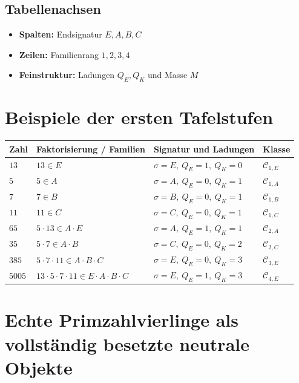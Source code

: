 \documentclass[12pt,a4paper]{article}
\newcommand{\sign}{\sigma}
\newcommand{\QE}{Q_E}
\newcommand{\QK}{Q_K}
\begin{document}
	\subsection*{Tabellenachsen}
	\begin{itemize}
		\item \textbf{Spalten:} Endsignatur $E,A,B,C$
		\item \textbf{Zeilen:} Familienrang $1,2,3,4$
		\item \textbf{Feinstruktur:} Ladungen $\QE,\QK$ und Masse $M$
	\end{itemize}
	
	\section{Beispiele der ersten Tafelstufen}
	
	\begin{longtable}{>{\raggedright\arraybackslash}p{2.5cm} >{\raggedright\arraybackslash}p{5.1cm} >{\raggedright\arraybackslash}p{4.2cm} >{\raggedright\arraybackslash}p{2.4cm}}
		\toprule
		\textbf{Zahl} & \textbf{Faktorisierung / Familien} & \textbf{Signatur und Ladungen} & \textbf{Klasse}\\
		\midrule
		\endhead
		
		$13$ & $13\in E$ & $\sign=E,\ \QE=1,\ \QK=0$ & $\mathcal C_{1,E}$\\
		$5$ & $5\in A$ & $\sign=A,\ \QE=0,\ \QK=1$ & $\mathcal C_{1,A}$\\
		$7$ & $7\in B$ & $\sign=B,\ \QE=0,\ \QK=1$ & $\mathcal C_{1,B}$\\
		$11$ & $11\in C$ & $\sign=C,\ \QE=0,\ \QK=1$ & $\mathcal C_{1,C}$\\
		$65$ & $5\cdot 13\in A\cdot E$ & $\sign=A,\ \QE=1,\ \QK=1$ & $\mathcal C_{2,A}$\\
		$35$ & $5\cdot 7\in A\cdot B$ & $\sign=C,\ \QE=0,\ \QK=2$ & $\mathcal C_{2,C}$\\
		$385$ & $5\cdot 7\cdot 11\in A\cdot B\cdot C$ & $\sign=E,\ \QE=0,\ \QK=3$ & $\mathcal C_{3,E}$\\
		$5005$ & $13\cdot 5\cdot 7\cdot 11\in E\cdot A\cdot B\cdot C$ & $\sign=E,\ \QE=1,\ \QK=3$ & $\mathcal C_{4,E}$\\
		\bottomrule
	\end{longtable}
	
	\section{Echte Primzahlvierlinge als vollständig besetzte neutrale Objekte}
	
\end{document}
